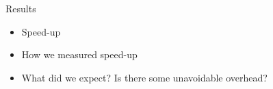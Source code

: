 \documentclass{beamer}
\begin{document}
\begin{frame}{Results}
    \pause
    \begin{itemize}
        \item Speed-up
        \pause
        \item How we measured speed-up
        \pause
        \item What did we expect? Is there some unavoidable overhead?
    \end{itemize}
\end{frame}
\end{document}
